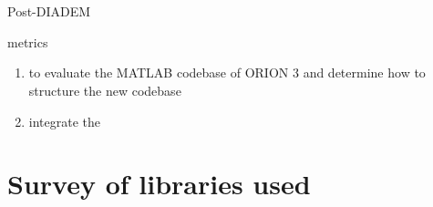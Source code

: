 ~\autocite{Duke-Southampton-archive:Cannon:1998,DIADEM-dataset:Brown:2011}

~\autocite{DIADEM&Beyond:Liu:2011,NeuroMorphTrends:Halavi:2012,NeuroTracePerspect:Meijering:2010}

Post-DIADEM
~\autocite{Bauer2010,MIA-anisotropic-path-searching-Xie2011,MICCAI-anisotropic-path-searching-Xie2010,
Jeong2015,Luo2015,De2015,Gulyanon2015,ORION_Santamaria-Pang2015,Mukherjee2014,Hernandez-Herrera2014,Basu2014,Xiao2013,Jimenez2013,Basu2013,Mukherjee2013,Hernandez-Herrera2013,Ming2013,Lee2012,Czarnecki2012}

metrics~\autocite{Mayerich2011,Mayerich2012,btmorph-Torben-Nielsen2014,Costa2014,Gillette2015}

\begin{enumerate}[label=(\roman*)]
\item to evaluate the MATLAB codebase of ORION 3 and determine how to structure the new codebase
\item integrate the
\end{enumerate}

%

\section{Survey of libraries used}


